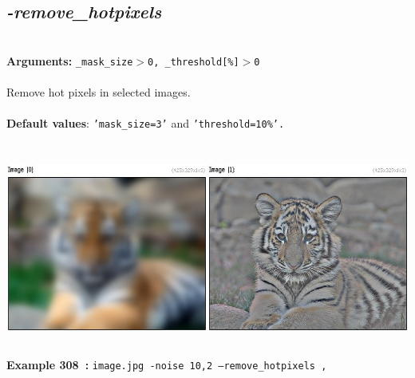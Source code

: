 \documentclass[a4paper,11pt,twoside]{book}
\begin{document}
\subsection{\emph{-remove\_hotpixels} }\vspace*{-0.5em}
~\\\textbf{Arguments: } 
{\small \texttt{\_mask\_size$>$0, \_threshold[\%]$>$0}}\\~\\
Remove hot pixels in selected images.
~\\~\\\textbf{Default values}: {\small \texttt{'mask\_size=3'} and \texttt{'threshold=10\%'.}}
\begin{center}\includegraphics[keepaspectratio=true,height=7cm,width=\textwidth]{img/gmic_def308.jpg}\\
{\footnotesize \textbf{Example 308~:} \texttt{image.jpg -noise 10,2 --remove\_hotpixels ,}}
\end{center}
\end{document}
